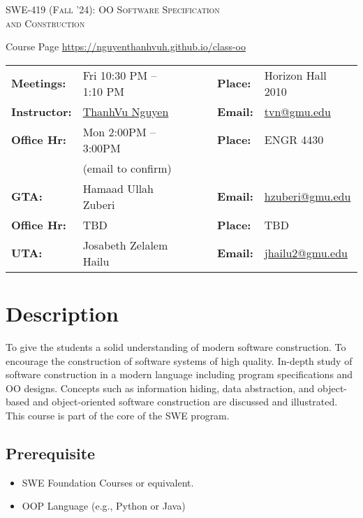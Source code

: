 \documentclass[11pt]{article}
\begin{document}
\begin{center}
{\Large \textsc{SWE-419 (Fall '24): OO Software Specification\\ and Construction}}
\end{center}
\begin{center}
Course Page \url{https://nguyenthanhvuh.github.io/class-oo}
\end{center}



\begin{minipage}[t]{.75\textwidth}
    \centering
\begin{tabular}{llcccll}
  \toprule
  \textbf{Meetings:} & Fri 10:30 PM -- 1:10 PM  & & & & \textbf{Place:} & Horizon Hall 2010\\
\textbf{Instructor:} & \href{https://go.gmu.edu/tvn}{ThanhVu Nguyen} & & &  & \textbf{Email:} &  \href{mailto:tvn@gmu.edu}{tvn@gmu.edu}\\
\textbf{Office Hr:} & Mon 2:00PM -- 3:00PM & & & & \textbf{Place:} & ENGR 4430\\
                     &(email to confirm)&&&&&\\
  \hline
\textbf{GTA:} & Hamaad Ullah Zuberi & & &  & \textbf{Email:} &  \href{mailto:hzuberi@gmu.edu}{hzuberi@gmu.edu}\\
\textbf{Office Hr:} & TBD & & & & \textbf{Place:} & TBD \\
  \hline
\textbf{UTA:} & Josabeth Zelalem Hailu & & &  & \textbf{Email:} &  \href{mailto:jhailu2@gmu.edu}{jhailu2@gmu.edu}\\
\bottomrule
\end{tabular}
\end{minipage}


\section{Description}

   To give the students a solid understanding of modern software construction. To encourage the construction of software systems of high quality. In-depth study of software construction in a modern language including program specifications and OO designs. Concepts such as information hiding, data abstraction, and object-based and object-oriented software construction are discussed and illustrated. This course is part of the core of the SWE program.

\subsection{Prerequisite}
\begin{itemize}
\item SWE Foundation Courses or equivalent.
\item OOP Language (e.g., Python or Java)
\end{itemize}
\end{document}
